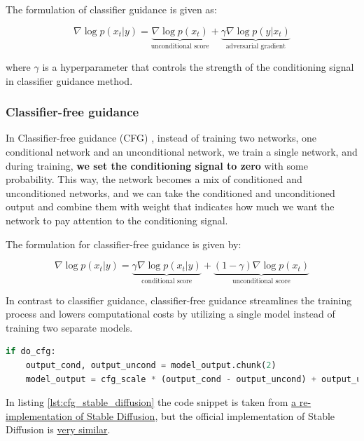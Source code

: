 The formulation of classifier guidance is given as:

\[
\nabla \log p(x_t | y) = \underbrace{\nabla \log p(x_t)}_{\text{unconditional score}} + \underbrace{\gamma \nabla \log p(y | x_t)}_{\text{adversarial gradient}}
\]

where $\gamma$ is a hyperparameter that controls the strength of the conditioning signal in classifier guidance method.








\subsubsection*{Classifier-free guidance}

In Classifier-free guidance (CFG) \cite{classifier_free_guidance}, instead of training two networks, one conditional network and an unconditional network, we train a single network, and during training, \textbf{we set the conditioning signal to zero} with some probability. This way, the network becomes a mix of conditioned and unconditioned networks, and we can take the conditioned and unconditioned output and combine them with weight that indicates how much we want the network to pay attention to the conditioning signal. 

The formulation for classifier-free guidance is given by:

\[
\nabla \log p(x_t | y) = \underbrace{\gamma \nabla \log p(x_t | y)}_{\text{conditional score}} + \underbrace{(1 - \gamma) \nabla \log p(x_t)}_{\text{unconditional score}}
\]

In contrast to classifier guidance, classifier-free guidance streamlines the training process and lowers computational costs by utilizing a single model instead of training two separate models.

\begin{lstlisting}[language=Python, caption={Classifier-free guidance (CFG) in Stable Diffusion.}, label={lst:cfg_stable_diffusion}]
if do_cfg:
    output_cond, output_uncond = model_output.chunk(2)
    model_output = cfg_scale * (output_cond - output_uncond) + output_uncond
\end{lstlisting}

In listing \ref{lst:cfg_stable_diffusion} the code snippet is taken from \href{https://github.com/hkproj/pytorch-stable-diffusion/blob/e0cb06de011787cdf13eed7b4287ad8410491149/sd/pipeline.py#L135C1-L136C1}{a re-implementation of Stable Diffusion}, but the official implementation of Stable Diffusion is \href{https://github.com/CompVis/stable-diffusion/blob/21f890f9da3cfbeaba8e2ac3c425ee9e998d5229/ldm/models/diffusion/ddim.py#L178C1-L179C1}{very similar}.


















